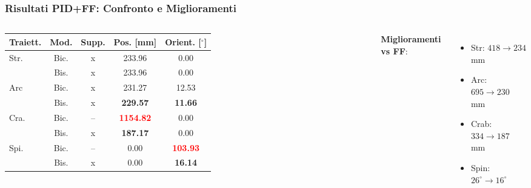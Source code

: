 \begin{frame}
    \frametitle{Risultati PID+FF: Confronto e Miglioramenti}
    \begin{columns}
        \begin{table}
            \centering
            \tiny
            \begin{tabular}{@{}lcccc@{}}
                \toprule
                \textbf{Traiett.} & \textbf{Mod.} & \textbf{Supp.} & \textbf{Pos. [mm]}                & \textbf{Orient. [$^\circ$]}      \\
                \midrule
                \multirow{2}{*}{Str.}
                                  & Bic.          & x              & 233.96                            & 0.00                             \\
                                  & Bis.          & x              & 233.96                            & 0.00                             \\
                \midrule
                \multirow{2}{*}{Arc}
                                  & Bic.          & x              & 231.27                            & 12.53                            \\
                                  & Bis.          & x              & \textbf{229.57}                   & \textbf{11.66}                   \\
                \midrule
                \multirow{2}{*}{Cra.}
                                  & Bic.          & --             & \textcolor{red}{\textbf{1154.82}} & 0.00                             \\
                                  & Bis.          & x              & \textbf{187.17}                   & 0.00                             \\
                \midrule
                \multirow{2}{*}{Spi.}
                                  & Bic.          & --             & 0.00                              & \textcolor{red}{\textbf{103.93}} \\
                                  & Bis.          & x              & 0.00                              & \textbf{16.14}                   \\
                \bottomrule
            \end{tabular}
        \end{table}

        \textbf{Miglioramenti vs FF}:
        \begin{itemize}
            \item Str: $418 \to 234$ mm
            \item Arc: $695 \to 230$ mm
            \item Crab: $334 \to 187$ mm
            \item Spin: $26^\circ \to 16^\circ$
        \end{itemize}
    \end{columns}
\end{frame}

